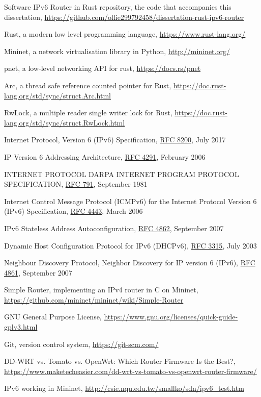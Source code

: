 \documentclass[12pt,a4paper,twoside,openright]{report}
\begin{document}
\begin{thebibliography}{1}

 Software IPv6 Router in Rust repository, the code that accompanies this dissertation, \url{https://github.com/ollie299792458/dissertation-rust-ipv6-router}

 Rust, a modern low level programming language, \url{https://www.rust-lang.org/}

 Mininet, a network virtualisation library in Python, \url{http://mininet.org/}

 pnet, a low-level networking API for rust, \url{https://docs.rs/pnet}

 Arc, a thread safe reference counted pointer for Rust, \url{https://doc.rust-lang.org/std/sync/struct.Arc.html}

RwLock, a multiple reader single writer lock for Rust, \url{https://doc.rust-lang.org/std/sync/struct.RwLock.html}

 Internet Protocol, Version 6 (IPv6) Specification, \href{https://tools.ietf.org/html/rfc8200}{RFC 8200}, July 2017

 IP Version 6 Addressing Architecture, \href{https://tools.ietf.org/html/rfc4291}{RFC 4291}, February 2006

 INTERNET PROTOCOL DARPA INTERNET PROGRAM PROTOCOL SPECIFICATION, \href{https://tools.ietf.org/html/rfc791}{RFC 791}, September 1981

 Internet Control Message Protocol (ICMPv6) for the Internet Protocol Version 6 (IPv6) Specification, \href{https://tools.ietf.org/html/rfc4443}{RFC 4443}, March 2006

 IPv6 Stateless Address Autoconfiguration, \href{https://tools.ietf.org/html/rfc4862}{RFC 4862}, September 2007

 Dynamic Host Configuration Protocol for IPv6 (DHCPv6), \href{https://tools.ietf.org/html/rfc3315}{RFC 3315}, July 2003

 Neighbour Discovery Protocol, Neighbor Discovery for IP version 6 (IPv6), \href{https://tools.ietf.org/html/rfc4861}{RFC 4861}, September 2007

 Simple Router, implementing an IPv4 router in C on Mininet, \url{https://github.com/mininet/mininet/wiki/Simple-Router}

 GNU General Purpose License, \url{https://www.gnu.org/licenses/quick-guide-gplv3.html}

 Git, version control system, \url{https://git-scm.com/}

 DD-WRT vs. Tomato vs. OpenWrt: Which Router Firmware Is the Best?, \url{https://www.maketecheasier.com/dd-wrt-vs-tomato-vs-openwrt-router-firmware/}

 IPv6 working in Mininet, \url{http://csie.nqu.edu.tw/smallko/sdn/ipv6_test.htm}

\end{thebibliography}
\end{document}
